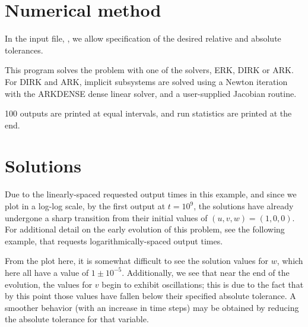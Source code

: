 \documentclass[letterpaper,10pt,english]{sphinxmanual}
\begin{document}
\section{Numerical method}
\label{ark_robertson:numerical-method}
In the input file, , we allow specification of
the desired relative and absolute tolerances.

This program solves the problem with one of the solvers, ERK, DIRK or
ARK.  For DIRK and ARK, implicit subsystems are solved using a Newton
iteration with the ARKDENSE dense linear solver, and a user-supplied
Jacobian routine.

100 outputs are printed at equal intervals, and run statistics are
printed at the end.


\section{Solutions}
\label{ark_robertson:solutions}
Due to the linearly-spaced requested output times in this example, and
since we plot in a log-log scale, by the first output at
$t=10^9$, the solutions have already undergone a sharp
transition from their initial values of $(u,v,w) = (1, 0, 0)$.
For additional detail on the early evolution of this problem, see the
following example, that requests logarithmically-spaced output times.

From the plot here, it is somewhat difficult to see the solution
values for $w$, which here all have a value of
$1\pm10^{-5}$.  Additionally, we see that near the end of the
evolution, the values for $v$ begin to exhibit oscillations;
this is due to the fact that by this point those values have fallen
below their specified absolute tolerance.  A smoother behavior (with
an increase in time steps) may be obtained by reducing the absolute
tolerance for that variable.
\begin{figure}[htbp]
\centering

\end{figure}
\end{document}
